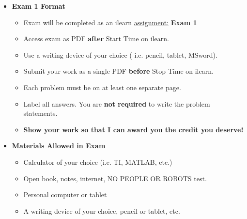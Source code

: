 \documentclass[11pt]{article}
\begin{document}
\begin{itemize}
             	\item  \textbf{\Large Exam 1 Format}
\begin{itemize}
		
			\item Exam will be completed as an ilearn \underline{assignment:} {\bf Exam  1} 
			
			\item Access exam as PDF {\bf after} Start Time on ilearn.
			\item Use a writing device of your choice ( i.e. pencil, tablet, MSword).
			\item Submit your work as a single PDF {\bf before} Stop Time on ilearn.		 		
			\item Each problem must be on at least one separate page.
			\item Label all answers. You are {\bf not required} to write the problem statements.
			\item {\bf Show your work so that I can award you the credit you deserve!}
\end{itemize}


		

		\item  \textbf{ Materials Allowed in Exam}

	\begin{itemize}

		\item  Calculator of your choice (i.e. TI, MATLAB, etc.)
	
		\item  Open book, notes, internet, NO PEOPLE OR ROBOTS test.\vspace{1mm}
		
		\item  Personal computer or tablet
			
		\item  A writing device of your choice, pencil or tablet, etc.
		

\end{itemize}
\end{itemize}
\end{document}
